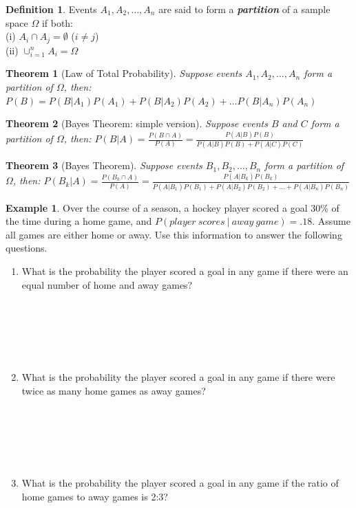 \documentclass[
  11pt,
]{book}
\newtheorem{theorem}{Theorem}[chapter]
\theoremstyle{definition}
\newtheorem{definition}{Definition}[chapter]
\theoremstyle{definition}
\newtheorem{example}{Example}[chapter]
\theoremstyle{definition}
\theoremstyle{definition}
\theoremstyle{remark}
\begin{document}
\begin{definition}
Events \(A_1, A_2, \ldots, A_n\) are said to form a \textbf{\emph{partition}} of a sample space \(\Omega\) if both:\\
(i) \(A_i \cap A_j = \emptyset\) (\(i \neq j\))\\
(ii) \(\cup_{i=1}^n A_i = \Omega\)\\
\end{definition}

\begin{theorem}[Law of Total Probability]
Suppose events \(A_1, A_2, \ldots, A_n\) form a partition of \(\Omega\), then:
\(P(B) = P(B|A_1)P(A_1) + P(B|A_2)P(A_2) + \ldots P(B|A_n)P(A_n)\)
\end{theorem}

\begin{theorem}[Bayes Theorem: simple version]
Suppose events \(B\) and \(C\) form a partition of \(\Omega\), then:
\(P(B|A) = \frac{P(B \cap A)}{P(A)} = \frac{P(A|B)P(B)}{P(A|B)P(B)+P(A|C)P(C)}\)
\end{theorem}

\begin{theorem}[Bayes Theorem]
Suppose events \(B_1, B_2, \ldots, B_n\) form a partition of \(\Omega\), then:
\(P(B_k|A) = \frac{P(B_k \cap A)}{P(A)} = \frac{P(A|B_k)P(B_k)}{P(A|B_1)P(B_1)+P(A|B_2)P(B_2) + \ldots + P(A|B_n)P(B_n)}\)
\end{theorem}

\begin{example}
Over the course of a season, a hockey player scored a goal 30\% of the time during a home game, and \(P(player\ scores\ |\ away\ game) = .18\). Assume all games are either home or away. Use this information to answer the following questions.
\end{example}

\begin{enumerate}
\def\labelenumi{(\alph{enumi})}
\item
  What is the probability the player scored a goal in any game if there were an equal number of home and away games?\\
  \strut \\
  \strut \\
  \strut \\
\item
  What is the probability the player scored a goal in any game if there were twice as many home games as away games?\\
  \strut \\
  \strut \\
  \strut \\
\item
  What is the probability the player scored a goal in any game if the ratio of home games to away games is 2:3?\\
  \strut \\
  \strut \\
  \strut \\
\end{enumerate}
\end{document}

